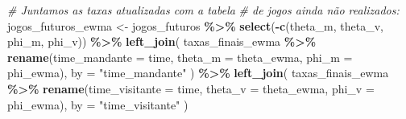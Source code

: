 \documentclass[11pt,]{article}
\newenvironment{Shaded}{\begin{snugshade}}{\end{snugshade}}
\newcommand{\AttributeTok}[1]{\textcolor[rgb]{0.13,0.29,0.53}{#1}}
\newcommand{\CommentTok}[1]{\textcolor[rgb]{0.56,0.35,0.01}{\textit{#1}}}
\newcommand{\FunctionTok}[1]{\textcolor[rgb]{0.13,0.29,0.53}{\textbf{#1}}}
\newcommand{\NormalTok}[1]{#1}
\newcommand{\OtherTok}[1]{\textcolor[rgb]{0.56,0.35,0.01}{#1}}
\newcommand{\SpecialCharTok}[1]{\textcolor[rgb]{0.81,0.36,0.00}{\textbf{#1}}}
\newcommand{\StringTok}[1]{\textcolor[rgb]{0.31,0.60,0.02}{#1}}
\begin{document}
\begin{Shaded}
\begin{Highlighting}[]
\CommentTok{\# Juntamos as taxas atualizadas com a tabela}
\CommentTok{\# de jogos ainda não realizados:}
\NormalTok{jogos\_futuros\_ewma }\OtherTok{\textless{}{-}}\NormalTok{ jogos\_futuros }\SpecialCharTok{\%\textgreater{}\%}
    \FunctionTok{select}\NormalTok{(}\SpecialCharTok{{-}}\FunctionTok{c}\NormalTok{(theta\_m, theta\_v, phi\_m, phi\_v)) }\SpecialCharTok{\%\textgreater{}\%}
    \FunctionTok{left\_join}\NormalTok{(}
\NormalTok{        taxas\_finais\_ewma }\SpecialCharTok{\%\textgreater{}\%} \FunctionTok{rename}\NormalTok{(}\AttributeTok{time\_mandante =}\NormalTok{ time,}
                                     \AttributeTok{theta\_m =}\NormalTok{ theta\_ewma,}
                                     \AttributeTok{phi\_m =}\NormalTok{ phi\_ewma),}
        \AttributeTok{by =} \StringTok{"time\_mandante"}
\NormalTok{    ) }\SpecialCharTok{\%\textgreater{}\%}
    \FunctionTok{left\_join}\NormalTok{(}
\NormalTok{        taxas\_finais\_ewma }\SpecialCharTok{\%\textgreater{}\%} \FunctionTok{rename}\NormalTok{(}\AttributeTok{time\_visitante =}\NormalTok{ time,}
                                     \AttributeTok{theta\_v =}\NormalTok{ theta\_ewma,}
                                     \AttributeTok{phi\_v =}\NormalTok{ phi\_ewma),}
        \AttributeTok{by =} \StringTok{"time\_visitante"}
\NormalTok{    )}


\end{Highlighting}
\end{Shaded}
\end{document}
